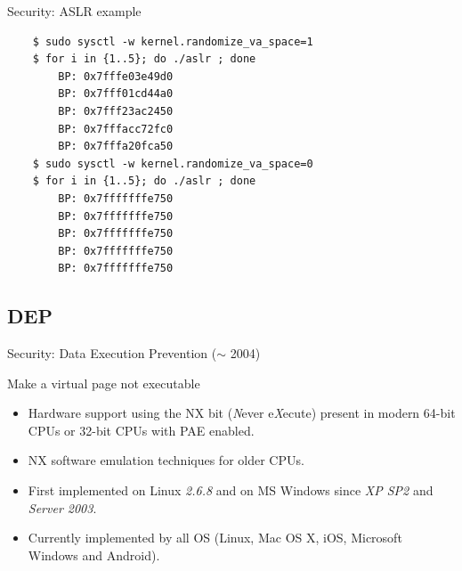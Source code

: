 \begin{frame}[fragile]{Security: ASLR example}
	\begin{lstlisting}
	$ sudo sysctl -w kernel.randomize_va_space=1
	$ for i in {1..5}; do ./aslr ; done
		BP: 0x7fffe03e49d0
		BP: 0x7fff01cd44a0
		BP: 0x7fff23ac2450
		BP: 0x7fffacc72fc0
		BP: 0x7fffa20fca50
	$ sudo sysctl -w kernel.randomize_va_space=0
	$ for i in {1..5}; do ./aslr ; done
		BP: 0x7fffffffe750
		BP: 0x7fffffffe750
		BP: 0x7fffffffe750
		BP: 0x7fffffffe750
		BP: 0x7fffffffe750
	\end{lstlisting}
\end{frame}

\subsection{DEP}
\begin{frame}{Security: Data Execution Prevention ($\sim$ 2004)}
	\begin{block}{Make a virtual page not executable}
		\begin{itemize}
			\item Hardware support using the NX bit (\emph{N}ever e\emph{X}ecute)
				present in modern 64-bit CPUs or 32-bit CPUs with PAE enabled.
			\item NX software emulation techniques for older CPUs.
			\item First implemented on Linux \emph{2.6.8} and on MS Windows since
				\emph{XP SP2} and \emph{Server 2003}.
			\item Currently implemented by all OS (Linux, Mac OS X, iOS, Microsoft Windows and Android).
		\end{itemize}
	\end{block}
\end{frame}


